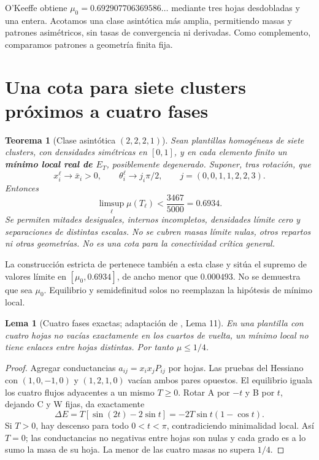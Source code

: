 \documentclass[10pt,a4paper]{article}
\newtheorem{teorema}{Teorema}
\newtheorem{lema}{Lema}
\newcommand{\muo}{\mu_0}
\begin{document}
O'Keeffe \cite{okeeffe} obtiene $\muo=0.692907706369586\ldots$ mediante tres hojas desdobladas y una entera. Acotamos una clase asintótica más amplia, permitiendo masas y patrones asimétricos, sin tasas de convergencia ni derivadas. Como complemento, comparamos patrones a geometría finita fija.

\clearpage
\section{Una cota para siete clusters próximos a cuatro fases}
\begin{teorema}[Clase asintótica $(2,2,2,1)$]
Sean plantillas homogéneas de siete clusters, con densidades simétricas en $[0,1]$, y en cada elemento finito un \textbf{mínimo local real de $E_T$}, posiblemente degenerado. Suponer, tras rotación, que
\[
 x_i^\ell\longrightarrow\bar x_i>0,\qquad
 \theta_i^\ell\longrightarrow j_i\pi/2,\qquad j=(0,0,1,1,2,2,3).
\]
Entonces
\[
 \boxed{\limsup_\ell\mu(T_\ell)<\frac{3467}{5000}=0.6934.}
\]
Se permiten mitades desiguales, internos incompletos, densidades límite cero y separaciones de distintas escalas. No se cubren masas límite nulas, otros repartos ni otras geometrías. No es una cota para la conectividad crítica general.
\end{teorema}

La construcción estricta de \cite{okeeffe} pertenece también a esta clase y sitúa el supremo de valores límite en $[\muo,0.6934]$, de ancho menor que $0.000493$. No se demuestra que sea $\muo$. Equilibrio y semidefinitud solos no reemplazan la hipótesis de mínimo local.

\begin{lema}[Cuatro fases exactas; adaptación de \cite{lz}, Lema 11]
En una plantilla con cuatro hojas no vacías exactamente en los cuartos de vuelta, un mínimo local no tiene enlaces entre hojas distintas. Por tanto $\mu\leq1/4$.
\end{lema}
\begin{proof}
Agregar conductancias $a_{ij}=x_ix_jP_{ij}$ por hojas. Las pruebas del Hessiano con $(1,0,-1,0)$ y $(1,2,1,0)$ vacían ambos pares opuestos. El equilibrio iguala los cuatro flujos adyacentes a un mismo $T\geq0$. Rotar A por $-t$ y B por $t$, dejando C y W fijas, da exactamente
\[
 \Delta E=T[\sin(2t)-2\sin t]=-2T\sin t(1-\cos t).
\]
Si $T>0$, hay descenso para todo $0<t<\pi$, contradiciendo minimalidad local. Así $T=0$; las conductancias no negativas entre hojas son nulas y cada grado es a lo sumo la masa de su hoja. La menor de las cuatro masas no supera $1/4$.
\end{proof}
\end{document}
